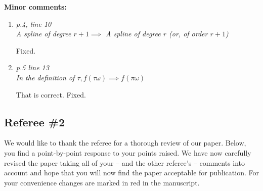\documentclass{scrartcl}
\newcommand{\refereeQuote}{\textit }
\newcommand{\response}{}
\begin{document}
\textbf{Minor comments:}
\begin{enumerate}
\item
\refereeQuote{p.4, line 10\\
A spline of degree $r+1\implies$ A spline of degree $r$ (or, of order $r+1$)}\smallskip

\response{Fixed.}\bigskip

\item
\refereeQuote{p.5 line 13\\
In the definition of $\tau, f(\tau \omega)\implies f(\pi \omega)$}\smallskip

\response{That is correct.  Fixed. }\bigskip

\end{enumerate}


\subsection*{Referee \#2}


\response{We would like to thank the referee for a thorough review of our paper. Below, you find a point-by-point response to your points raised. We have now carefully revised the paper taking all of your -- and the other referee's -- comments into account and hope that you will now find the paper acceptable for publication. For your convenience changes are marked in red in the manuscript.
} \smallskip
\end{document}
